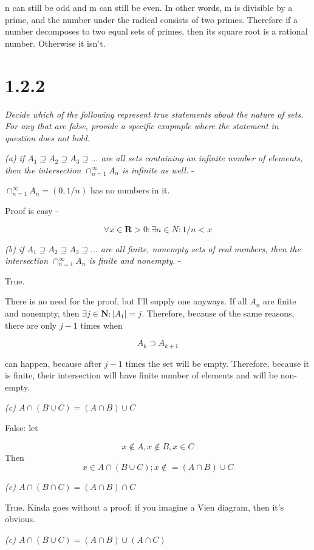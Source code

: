 \documentclass[11pt,oneside,titlepage]{article}
\begin{document}
n can still be odd and m can still be even. In other words, m is divisible by
a prime, and the number under the radical consists of two primes. Therefore
if a number decomposes to two equal sets of primes, then its square root is
a rational number. Otherwise it isn't.

\section*{1.2.2}

\textit{Decide which of the following represent true statements about the
  nature of sets. For any that are false, provide a specific exapmple where the
  statement in question does not hold.}

\textit{(a) if $A_1 \supseteq A_2 \supseteq A_3 \supseteq ... $ are all sets
  containing an infinite number of elements, then the intersection
  $\cap_{n = 1}^{\infty} A_n$ is infinite as well.} -

$\cap_{n = 1}^{\infty} A_n = (0, 1/n)$ has no numbers in it.

Proof is easy -

$$\forall x \in \textbf{R} > 0: \exists n \in N: 1/n < x$$

\textit{(b) if $A_1 \supseteq A_2 \supseteq A_3 \supseteq ... $ are all finite,
  nonempty sets of real numbers, then the intersection
  $\cap_{n = 1}^{\infty} A_n$ is finite and nonempty.} -

True.

There is no need for the proof, but I'll supply one anyways. If all $A_n$ are
finite and nonempty, then $\exists j \in \textbf{N} : |A_1| = j$. Therefore,
because of the same reasons, there are only $j - 1$ times when

$$A_k \supset A_{k + 1}$$

can happen, because after $j - 1$ times the set will be empty. Therefore,
because it is finite, their intersection will have finite number of
elements and will be non-empty.

\textit{(c) $A \cap (B \cup C) = (A \cap B) \cup C$}

False: let

$$x \notin A, x \notin B, x \in C$$
Then
$$x \in A \cap (B \cup C); x \notin = (A \cap B) \cup C$$

\textit{(c) $A \cap (B \cap C) = (A \cap B) \cap C$}

True. Kinda goes without a proof; if you imagine a Vien diagram, then it's
obvious.

\textit{(c) $A \cap (B \cup C) = (A \cap B)  \cup (A \cap C)$}
\end{document}
